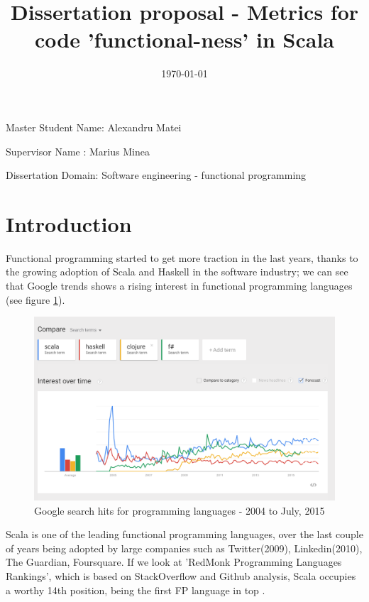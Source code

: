 \documentclass{article}
\title{Dissertation proposal - Metrics for code 'functional-ness' in Scala }
\date{\today}
\begin{document}
\maketitle

\vspace{30mm} %

\begin{center}
Master Student Name: Alexandru Matei \par
Supervisor Name : Marius Minea \par
Dissertation Domain: Software engineering - functional programming
\end{center}

\vfill

\newpage
\tableofcontents
\newpage

\section{Introduction}
Functional programming started to get more traction in the last years, thanks to the growing adoption of Scala and Haskell in the software industry; we can see that Google trends shows a rising interest in functional programming languages (see figure \ref{fig:google-rank}). \par

\begin{figure}[h!]
  \includegraphics[width=\linewidth]{google-trends.png}
  \caption{Google search hits for programming languages - 2004 to July, 2015 }
  \label{fig:google-rank}
\end{figure}

Scala is one of the leading functional programming languages, over the last couple of years being adopted by large companies such as  Twitter(2009), Linkedin(2010), The Guardian, Foursquare. If we look at 'RedMonk Programming Languages Rankings'\cite{redmonk:1}, which is based on StackOverflow and Github analysis,  Scala occupies a worthy 14th position, being the first FP language in top . \par
\end{document}
